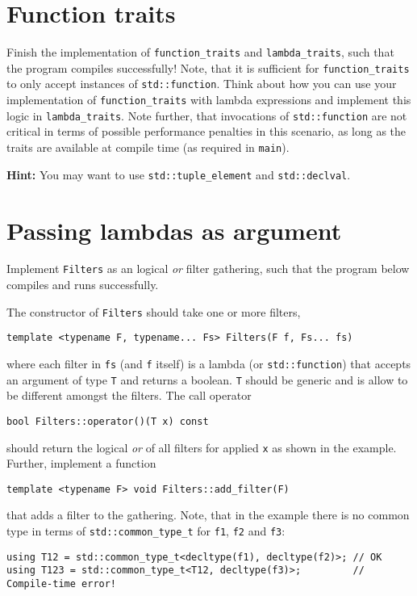 \documentclass{scrartcl}
\newcommand{\inputcpplisting}[1]{}
\begin{document}
\section{Function traits}
\label{sec:fcttraits}
Finish the implementation of \texttt{function\_traits} and \texttt{lambda\_traits}, such that the program compiles successfully! Note, that it is sufficient for \texttt{function\_traits} to only accept instances of \texttt{std::function}. Think about how you can use your implementation of \texttt{function\_traits} with lambda expressions and implement this logic in \texttt{lambda\_traits}. Note further, that invocations of \texttt{std::function} are not critical in terms of possible performance penalties in this scenario, as long as the traits are available at compile time (as required in \texttt{main}).

\inputcpplisting{snippet21a}

\textbf{Hint:} You may want to use \texttt{std::tuple\_element} and \texttt{std::declval}.

\newpage

\section{Passing lambdas as argument}
Implement \texttt{Filters} as an logical \textit{or} filter gathering, such that the program below compiles and runs successfully.

\inputcpplisting{snippet20a}

The constructor of \texttt{Filters} should take one or more filters,
\begin{lstlisting}
template <typename F, typename... Fs> Filters(F f, Fs... fs)
\end{lstlisting}
where each filter in \texttt{fs} (and \texttt{f} itself) is a lambda (or \texttt{std::function}) that accepts an argument of type \texttt{T} and returns a boolean. \texttt{T} should be generic and is allow to be different amongst the filters.
The call operator 
\begin{lstlisting}
bool Filters::operator()(T x) const
\end{lstlisting}
should return the logical \textit{or} of all filters for applied \texttt{x} as shown in the example.
Further, implement a function
\begin{lstlisting}
template <typename F> void Filters::add_filter(F)
\end{lstlisting}
that adds a filter to the gathering. Note, that in the example there is no common type in terms of \texttt{std::common\_type\_t} for \texttt{f1}, \texttt{f2} and \texttt{f3}:
\begin{lstlisting}
using T12 = std::common_type_t<decltype(f1), decltype(f2)>; // OK
using T123 = std::common_type_t<T12, decltype(f3)>;         // Compile-time error!
\end{lstlisting}
\end{document}
